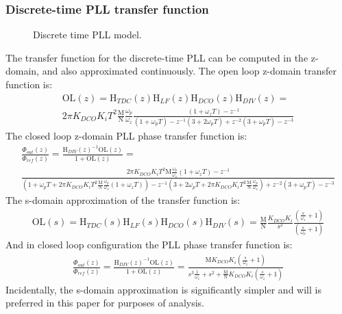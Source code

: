 \subsubsection{Discrete-time PLL transfer function}
\begin{figure}[htb!]
	\center
	\caption{Discrete time PLL model.}
	\label{fig:discrete_pll2}
\end{figure}
\FloatBarrier
The transfer function for the discrete-time PLL can be computed in the z-domain, and also approximated continuously. The open loop z-domain transfer function is:
\begin{align}
\mathrm{OL}(z) = \mathrm{H}_{TDC}(z)\mathrm{H}_{LF}(z)\mathrm{H}_{DCO}(z)\mathrm{H}_{DIV}(z) = \\
2\pi K_{DCO}K_iT^2\frac{\mathrm{M}}{\mathrm{N}}\frac{\omega_p}{\omega_z}\frac{(1+\omega_zT)-z^{-1}}{(1+\omega_pT) - z^{-1}(3+2\omega_pT) + z^{-2}(3+\omega_pT) - z^{-3}}\label{eq:z_lf}
\end{align}
The closed loop z-domain PLL phase transfer function is:
\begin{align}
\frac{\Phi_{out}(z)}{\Phi_{ref}(z)} = \frac{\mathrm{H}_{DIV}(z)^{-1}\mathrm{OL}(z)}{1+\mathrm{OL}(z)} = \\
\frac{2\pi K_{DCO}K_iT^2\mathrm{M}\frac{\omega_p}{\omega_z}(1+\omega_zT)-z^{-1}}{(1+\omega_pT + 2\pi K_{DCO}K_iT^2\frac{\mathrm{M}}{\mathrm{N}}\frac{\omega_p}{\omega_z}(1+\omega_zT))- z^{-1}(3+2\omega_pT+2\pi K_{DCO}K_iT^2\frac{\mathrm{M}}{\mathrm{N}}\frac{\omega_p}{\omega_z})+ z^{-2}(3+\omega_pT) - z^{-3}}
\end{align}
The s-domain approximation of the transfer function is:
\begin{align}
\mathrm{OL}(s) = \mathrm{H}_{TDC}(s)\mathrm{H}_{LF}(s)\mathrm{H}_{DCO}(s)\mathrm{H}_{DIV}(s) = \frac{\mathrm{M}}{\mathrm{N}}\frac{K_{DCO}K_i}{s^2} \frac{\left(\frac{s}{\omega_z} + 1\right)}{\left(\frac{s}{\omega_p} + 1\right)}
\end{align}
And in closed loop configuration the PLL phase transfer function is:
\begin{align}
\frac{\Phi_{out}(z)}{\Phi_{ref}(z)} = \frac{\mathrm{H}_{DIV}(z)^{-1}\mathrm{OL}(z)}{1+\mathrm{OL}(z)} = \frac{\mathrm{M}K_{DCO}K_i\left(\frac{s}{\omega_z} + 1\right)}{s^3\frac{1}{\omega_z} + s^2 + \frac{\mathrm{M}}{\mathrm{N}}K_{DCO}K_i\left(\frac{s}{\omega_z} + 1\right)}
\end{align}
Incidentally, the s-domain approximation is significantly simpler and will is preferred in this paper for purposes of analysis.


